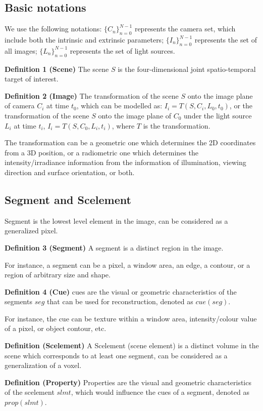 \subsection{Basic notations}
We use the following notations: $\{C_n\}_{n=0}^{N-1}$ represents the camera set, which include both the intrinsic and extrinsic parameters; $\{I_n\}_{n=0}^{N-1}$ represents the set of all images; $\{L_n\}_{n=0}^{N-1}$ represents the set of light sources.

\textbf{Definition 1 (Scene)} The scene $S$ is the four-dimensional joint spatio-temporal target of interest.

\textbf{Definition 2 (Image)} The transformation of the scene $S$ onto the image plane of camera $C_i$ at time $t_0$, which can be modelled as: $I_i = T(S, C_i, L_0, t_0)$, or the transformation of the scene $S$ onto the image plane of $C_0$  under the light source $L_i$ at time $t_i$, $I_i= T(S, C_0, L_i, t_i)$, where $T$ is the transformation.

The transformation can be a geometric one which determines the 2D coordinates from a 3D position, or a radiometric one which determines the intensity/irradiance information from the information of illumination, viewing direction and surface orientation, or both.

\subsection{Segment and Scelement}
Segment is the lowest level element in the image, can be considered as a generalized pixel.

\textbf{Definition 3 (Segment)} A segment is a distinct region in the image.

For instance, a segment can be a pixel, a window area, an edge, a contour, or a region of arbitrary size and shape.

\textbf{Definition 4 (Cue)} cues are the visual or geometric characteristics of the segments $seg$ that can be used for reconstruction, denoted as $cue(seg)$.

For instance, the cue can be texture within a window area, intensity/colour value of a pixel, or object contour, etc.

\textbf{Definition (Scelement)} A Scelement (scene element) is a distinct volume in the scene which corresponds to at least one segment, can be considered as a generalization of a voxel.

\textbf{Definition (Property)} Properties are the visual and geometric characteristics of the scelement $slmt$, which would influence the cues of a segment, denoted as $prop(slmt)$.


